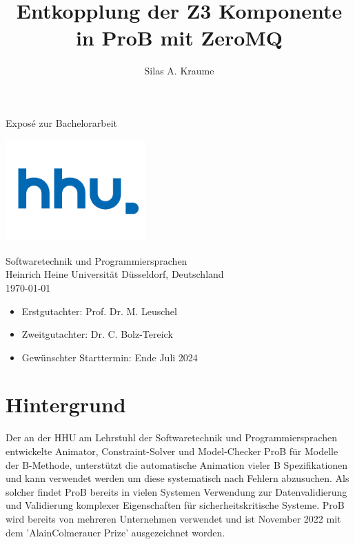\documentclass[11pt,a4paper]{scrartcl}
\begin{document}
\author{Silas A. Kraume}
\title{Entkopplung der Z3 Komponente in ProB mit ZeroMQ}
\begin{titlepage}
    \begin{center}
        \vspace*{1cm}
        \Huge
        \makeatletter
        \textbf{\@title}
        \makeatother
        \vspace{1.5cm}

        \LARGE
        \makeatletter
        \textbf{\@author}
        \makeatother
        \vfill

        Exposé zur Bachelorarbeit

        \vfill

        \includegraphics[width=0.4\textwidth]{hhu-logo}

        \Large
        Softwaretechnik und Programmiersprachen\\
        Heinrich Heine Universität Düsseldorf, Deutschland\\
        \today
        \vfill

        \large\begin{itemize}
            \item Erstgutachter: \space\space Prof. Dr. M. Leuschel
            \item Zweitgutachter: Dr. C. Bolz-Tereick
            \item Gewünschter Starttermin: Ende Juli 2024
        \end{itemize}

    \end{center}
\end{titlepage}

\section{Hintergrund}
Der an der HHU am Lehrstuhl der Softwaretechnik und Programmiersprachen entwickelte Animator, Constraint-Solver und Model-Checker ProB \parencite{ProB_2} für Modelle der B-Methode,
unterstützt die automatische Animation vieler B Spezifikationen und kann verwendet werden um diese systematisch nach Fehlern abzusuchen.
Als solcher findet ProB bereits in vielen Systemen Verwendung zur Datenvalidierung und Validierung komplexer Eigenschaften für sicherheitskritische Systeme.
ProB wird bereits von mehreren Unternehmen verwendet und ist November 2022 mit dem 'AlainColmerauer Prize' ausgezeichnet worden.
\end{document}
